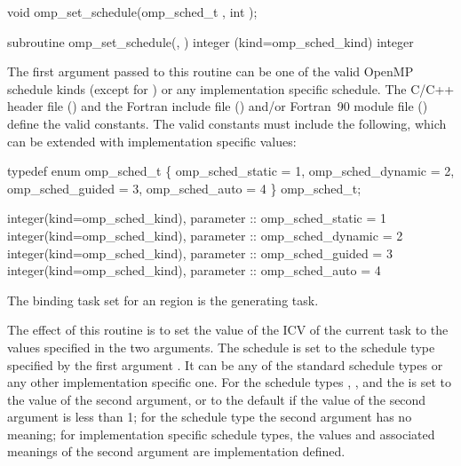 \format
\ccppspecificstart
\begin{boxedcode}
void omp\_set\_schedule(omp\_sched\_t , int );
\end{boxedcode}
\ccppspecificend

\fortranspecificstart
\begin{boxedcode}
subroutine omp\_set\_schedule(, ) 
integer (kind=omp\_sched\_kind) 
integer 
\end{boxedcode}
\fortranspecificend

\constraints
The first argument passed to this routine can be one of the valid OpenMP schedule kinds 
(except for ) or any implementation specific schedule. The C/C++ header file 
() and the Fortran include file () and/or Fortran~90 module file 
() define the valid constants. The valid constants must include the following, 
which can be extended with implementation specific values:

\pagebreak
\ccppspecificstart
\begin{boxedcode}
typedef enum omp\_sched\_t \{
    omp\_sched\_static = 1,
    omp\_sched\_dynamic = 2,
    omp\_sched\_guided = 3,
    omp\_sched\_auto = 4
\} omp\_sched\_t;
\end{boxedcode}
\ccppspecificend

\begin{samepage}
\fortranspecificstart
\begin{boxedcode}
integer(kind=omp\_sched\_kind), parameter :: omp\_sched\_static = 1
integer(kind=omp\_sched\_kind), parameter :: omp\_sched\_dynamic = 2
integer(kind=omp\_sched\_kind), parameter :: omp\_sched\_guided = 3
integer(kind=omp\_sched\_kind), parameter :: omp\_sched\_auto = 4
\end{boxedcode}
\fortranspecificend
\end{samepage}

\binding
The binding task set for an  region is the generating task. 

\effect
The effect of this routine is to set the value of the  ICV of the current task 
to the values specified in the two arguments. The schedule is set to the schedule type 
specified by the first argument . It can be any of the standard schedule types or 
any other implementation specific one. For the schedule types , , and 
 the  is set to the value of the second argument, or to the default 
 if the value of the second argument is less than 1; for the schedule type 
 the second argument has no meaning; for implementation specific schedule types, 
the values and associated meanings of the second argument are implementation defined.

